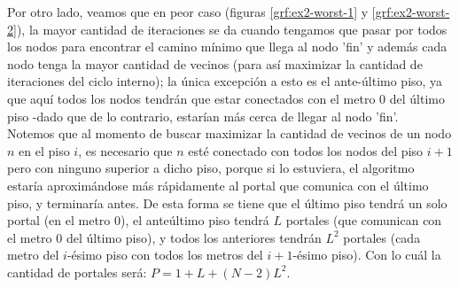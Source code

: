 \documentclass{article}
\theoremstyle{definition}
\theoremstyle{remark}
\begin{document}
Por otro lado, veamos que en peor caso (figuras \ref{grf:ex2-worst-1} y \ref{grf:ex2-worst-2}), la mayor cantidad de iteraciones se da cuando tengamos que pasar por todos los nodos para encontrar el camino mínimo que llega al nodo 'fin' y además cada nodo tenga la mayor cantidad de vecinos (para así maximizar la cantidad de iteraciones del ciclo interno); la única excepción a esto es el ante-último piso, ya que aquí todos los nodos tendrán que estar conectados con el metro 0 del último piso -dado que de lo contrario, estarían más cerca de llegar al nodo 'fin'.\\

Notemos que al momento de buscar maximizar la cantidad de vecinos de un nodo $n$ en el piso $i$, es necesario que $n$ esté conectado con todos los nodos del piso $i+1$ pero con ninguno superior a dicho piso, porque si lo estuviera, el algoritmo estaría aproximándose más rápidamente al portal que comunica con el último piso, y terminaría antes. De esta forma se tiene que el último piso tendrá un solo portal (en el metro 0), el anteúltimo piso tendrá $L$ portales (que comunican con el metro 0 del último piso), y todos los anteriores tendrán $L^2$ portales (cada metro del $i$-ésimo piso con todos los metros del $i+1$-ésimo piso). Con lo cuál la cantidad de portales será: $P = 1+L+(N-2)L^2$. \\

\pagebreak
\end{document}
